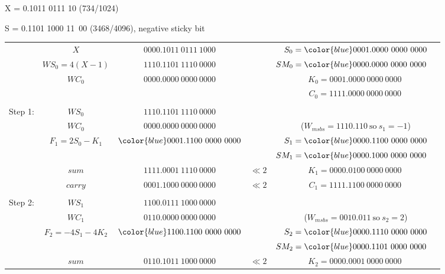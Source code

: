\documentclass[12pt]{article}
\begin{document}
X = 0.1011 0111 10 (734/1024)

S = 0.1101 1000 11\ 00 (3468/4096), negative sticky bit
{\small
\begin{center}
\begin{tabular}{ccccc}
            &$X             $&$         0000.1011\ 0111\ 1000   $&          &$S_0={\color{blue}0001}.0000\ 0000\ 0000$\\
            &$WS_0=4(X-1)   $&$         1110.1101\ 1110\ 0000   $&          &$SM_0={\color{blue}0000}.0000\ 0000\ 0000\phantom{M}$\\
            &$WC_0          $&$         0000.0000\ 0000\ 0000   $&          &$K_0=0001.0000\ 0000\ 0000\ $\\
            &                &                                   &          &$C_0=1111.0000\ 0000\ 0000\,$\\
    \hdashline\\
    Step 1: &$WS_0          $&$         1110.1101\ 1110\ 0000   $&          &\\
            &$WC_0          $&$         0000.0000\ 0000\ 0000   $&          &($W_{msbs}=1110.110\ \text{so}\ s_1=-1$)\\
            &$F_1=2S_0-K_1$&${\color{blue}0001.11}00\ 0000\ 0000$&          &$S_1={\color{blue}0000.11}00\ 0000\ 0000$\\
            &                &                                   &          &$SM_1={\color{blue}0000.10}00\ 0000\ 0000\phantom{M}$\\
    \cline{2-3}
            &$sum           $&$         1111.0001\ 1110\ 0000   $&$\ll2    $&$K_1=0000.0100\ 0000\ 0000\ $\\
            &$carry         $&$         0001.1000\ 0000\ 0000   $&$\ll2    $&$C_1=1111.1100\ 0000\ 0000\,$\\
    \hdashline\\    
    Step 2: &$WS_1          $&$         1100.0111\ 1000\ 0000   $&          &\\
            &$WC_1          $&$         0110.0000\ 0000\ 0000   $&          &($W_{msbs}=0010.011\ \text{so}\ s_2=2$)\\
            &$F_2=-4S_1-4K_2$&${\color{blue}1100.1100}\ 0000\ 0000$&        &$S_2={\color{blue}0000.1110}\ 0000\ 0000$\\
            &                &                                   &          &$SM_2={\color{blue}0000.1101}\ 0000\ 0000\phantom{M}$\\
    \cline{2-3}
            &$sum           $&$         0110.1011\ 1000\ 0000   $&$\ll2    $&$K_2=0000.0001\ 0000\ 0000\ $\\

\end{tabular}
\end{center}}
\end{document}
